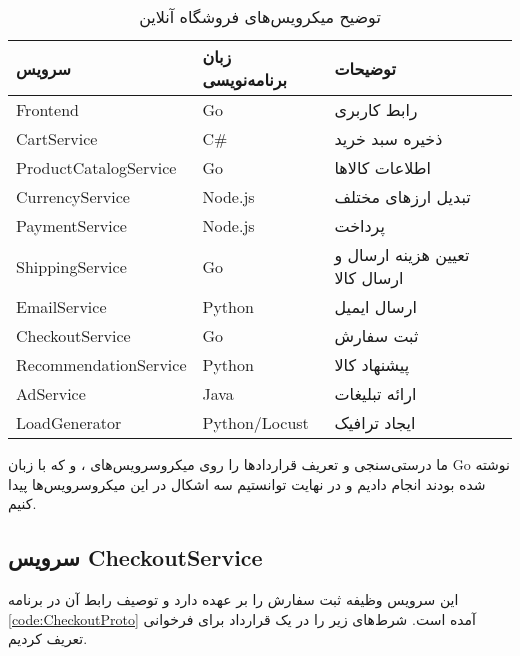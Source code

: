 \begin{table}
    \caption{توضیح میکرویس‌های فروشگاه آنلاین}
    \label{tab:microservices}
    \centering
    \begin{tabular}{|l|l|l|}
    \hline
        سرویس & زبان برنامه‌نویسی & توضیحات \\ \hline
        Frontend & Go & رابط کاربری \\ \hline
        CartService & C\# & ذخیره سبد خرید \\ \hline
        ProductCatalogService	 & Go & اطلاعات کالاها \\ \hline
        CurrencyService & Node.js & تبدیل ارز‌های مختلف \\ \hline
        PaymentService & Node.js & پرداخت \\ \hline
        ShippingService & Go & تعیین هزینه ارسال و ارسال کالا \\ \hline
        EmailService & Python & ارسال ایمیل \\ \hline
        CheckoutService & Go & ثبت سفارش \\ \hline
        RecommendationService & Python & پیشنهاد کالا \\ \hline
        AdService & Java & ارائه تبلیغات \\ \hline
        LoadGenerator & Python/Locust & ایجاد ترافیک \\ \hline
    \end{tabular}
\end{table}
ما درستی‌سنجی و تعریف قراردادها را روی میکروسرویس‌های 
،
و
که با زبان
Go
نوشته شده بودند انجام دادیم
\cite{forkedMicroservicesDemo}
و در نهایت توانستیم سه اشکال در این میکروسرویس‌ها پیدا کنیم.

\subsection{
سرویس CheckoutService
}

\singlespacing
\begin{figure}
	\begin{LTR}
		
	\end{LTR}
\end{figure}
\doublespacing

این سرویس وظیفه ثبت سفارش را بر عهده دارد و توصیف رابط آن در برنامه
\ref{code:CheckoutProto}
آمده است. شرط‌های زیر را در یک قرارداد برای فرخوانی
تعریف کردیم.


